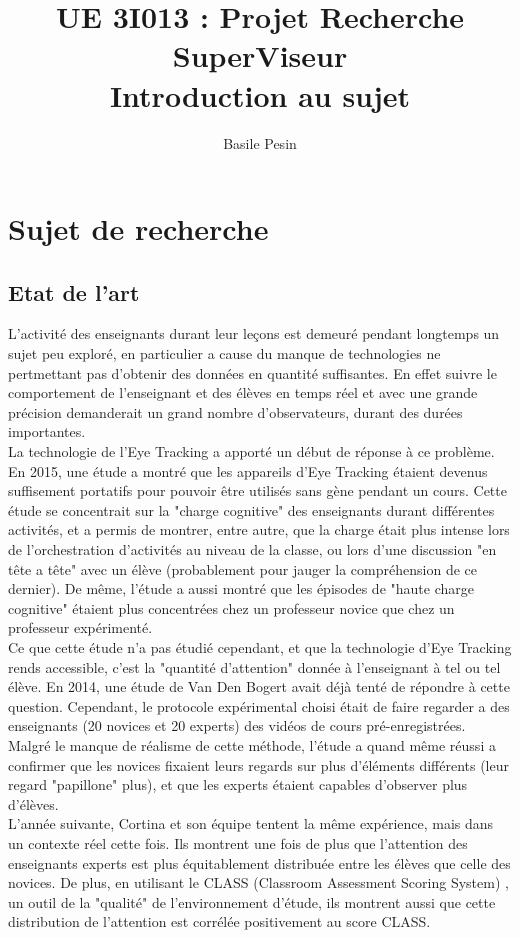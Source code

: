\documentclass{article}
\title{UE 3I013 : Projet Recherche\\
    SuperViseur\\
    Introduction au sujet}
\author{Basile Pesin}
\begin{document}
\maketitle
\newpage

\section{Sujet de recherche}
\subsection{Etat de l'art}
L'activité des enseignants durant leur leçons est demeuré pendant longtemps un sujet peu exploré, en particulier a cause du manque de technologies ne pertmettant pas d'obtenir des données en quantité suffisantes. En effet suivre le comportement de l'enseignant et des élèves en temps réel et avec une grande précision demanderait un grand nombre d'observateurs, durant des durées importantes.\\
La technologie de l'Eye Tracking a apporté un début de réponse à ce problème. En 2015, une étude \cite{OrchestrationLoad} a montré que les appareils d'Eye Tracking étaient devenus suffisement portatifs pour pouvoir être utilisés sans gène pendant un cours. Cette étude se concentrait sur la "charge cognitive" des enseignants durant différentes activités, et a permis de montrer, entre autre, que la charge était plus intense lors de l'orchestration d'activités au niveau de la classe, ou lors d'une discussion "en tête a tête" avec un élève (probablement pour jauger la compréhension de ce dernier). De même, l'étude a aussi montré que les épisodes de "haute charge cognitive" étaient plus concentrées chez un professeur novice que chez un professeur expérimenté.\\
Ce que cette étude n'a pas étudié cependant, et que la technologie d'Eye Tracking rends accessible, c'est la "quantité d'attention" donnée à l'enseignant à tel ou tel élève. En 2014, une étude de Van Den Bogert \cite{VanDenBogert} avait déjà tenté de répondre à cette question. Cependant, le protocole expérimental choisi était de faire regarder a des enseignants (20 novices et 20 experts) des vidéos de cours pré-enregistrées. Malgré le manque de réalisme de cette méthode, l'étude a quand même réussi a confirmer que les novices fixaient leurs regards sur plus d'éléments différents (leur regard "papillone" plus), et que les experts étaient capables d'observer plus d'élèves.\\
L'année suivante, Cortina et son équipe \cite{Cortina} tentent la même expérience, mais dans un contexte réel cette fois. Ils montrent une fois de plus que l'attention des enseignants experts est plus équitablement distribuée entre les élèves que celle des novices. De plus, en utilisant le CLASS (Classroom Assessment Scoring System) \cite{CLASS}, un outil de la "qualité" de l'environnement d'étude, ils montrent aussi que cette distribution de l'attention est corrélée positivement au score CLASS.\\
\end{document}
